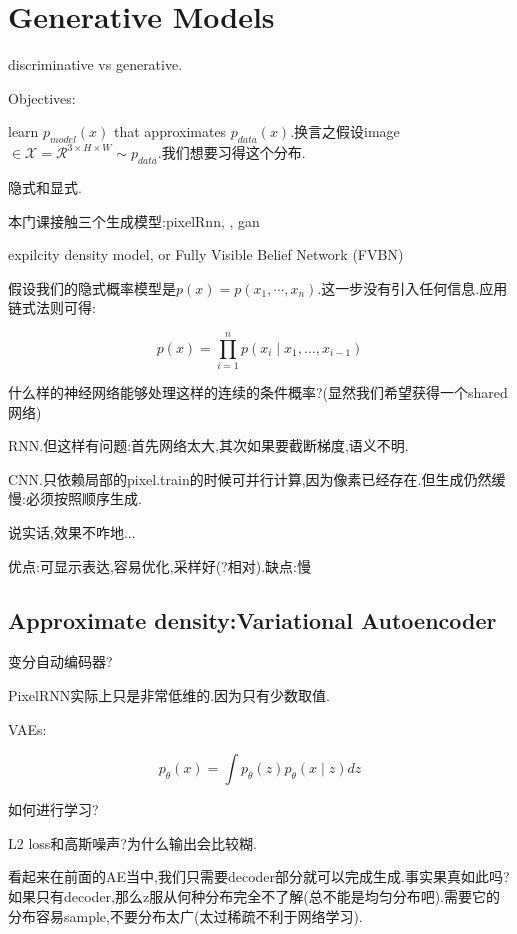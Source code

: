 \section{Generative Models}
	discriminative vs generative.
	
	Objectives:
	
	learn $p_{model}(x)$ that approximates $p_{data}(x)$.换言之假设image$ \in \mathcal{X} = \mathcal{R}^{3\times H \times W}\sim p_{data}$.我们想要习得这个分布.
	
	隐式和显式.
	
	本门课接触三个生成模型:pixelRnn, , gan
	
	expilcity density model, or Fully Visible Belief Network (FVBN)
	
	假设我们的隐式概率模型是$p(x) = p(x_1, \cdots, x_n)$.这一步没有引入任何信息.应用链式法则可得:
	
	\begin{equation}
		p(x)=\prod_{i=1}^{n} p\left(x_{i} \mid x_{1}, \ldots, x_{i-1}\right)
	\end{equation}
	
	什么样的神经网络能够处理这样的连续的条件概率?(显然我们希望获得一个shared 网络)
	
	RNN.但这样有问题:首先网络太大,其次如果要截断梯度,语义不明.
	
	CNN.只依赖局部的pixel.train的时候可并行计算,因为像素已经存在.但生成仍然缓慢:必须按照顺序生成.
	
	说实话,效果不咋地...
	
	优点:可显示表达,容易优化,采样好(?相对).缺点:慢
	
	\subsection{Approximate density:Variational Autoencoder}
	变分自动编码器?
	
	PixelRNN实际上只是非常低维的.因为只有少数取值.
	
	VAEs:
	
	\begin{equation}
		p_{\theta}(x)=\int p_{\theta}(z) p_{\theta}(x \mid z) d z
	\end{equation}
	
	如何进行学习?
	
	L2 loss和高斯噪声?为什么输出会比较糊.
	
	看起来在前面的AE当中,我们只需要decoder部分就可以完成生成.事实果真如此吗?如果只有decoder,那么z服从何种分布完全不了解(总不能是均匀分布吧).需要它的分布容易sample,不要分布太广(太过稀疏不利于网络学习).
	
